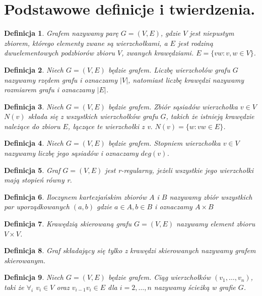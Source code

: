 \documentclass[12pt,a4paper]{article}
\newtheorem{df}{Definicja}[section]
\begin{document}
\section{Podstawowe definicje i twierdzenia.}
\begin{df} 
Grafem nazywamy par\k{e} $G=(V,E)$, gdzie $V$ jest niepustym zbiorem, kt\'orego elementy zwane s\k{a} wierzcho{\l}kami, a $E$ jest rodzin\k{a} dwuelementowych podzbior\'ow zbioru $V$, zwanych kraw\k{e}dziami.
$E=\{vw : v,w\in V \}$.
\end{df}
\begin{df} 
Niech $G=(V,E)$ b\k{e}dzie grafem. Liczb\k{e} wierzcho{\l}\'ow grafu $G$ nazywamy rz\k{e}dem grafu i oznaczamy $|V|$, natomiast liczb\k{e} kraw\k{e}dzi nazywamy rozmiarem grafu i oznaczamy $|E|$.
\end{df}
\begin{df} 
Niech $G=(V,E)$ b\k{e}dzie grafem. Zbi\'or s\k{a}siad\'ow wierzcho{\l}ka $v\in V$ $N(v)$ sk{\l}ada si\k{e} z wszystkich wierzcho{\l}k\'ow grafu $G$, takich \.ze istniej\k{a} kraw\k{e}dzie nale\.z\k{a}ce do zbioru $E$, {\l}\k{a}cz\k{a}ce te wierzcho{\l}ki z v. $N(v)=\{w : vw\in E\}$.
\end{df} 
\begin{df} 
Niech $G=(V,E)$ b\k{e}dzie grafem. Stopniem wierzcho{\l}ka $v\in V$ nazywamy liczb\k{e} jego s\k{a}siad\'ow i oznaczamy $deg(v)$.
\end{df}
\begin{df} 
Graf $G=(V,E)$ jest r-regularny, je\.zeli wszystkie jego wierzcho{\l}ki maj\k{a} stopie\'n r\'owny r.
\end{df} 
\begin{df} 
Iloczynem kartezja\'nskim zbior\'ow $A$ i $B$ nazywamy zbi\'or wszystkich par uporz\k{a}dkowanych $(a,b)$ gdzie $a\in A, b\in B$ i oznaczamy $A\times B$ 
\end{df}
\begin{df} 
Kraw\k{e}dzi\k{a} skierowan\k{a} grafu $G=(V,E)$ nazywamy element zbioru $V\times V$.
\end{df}
\begin{df} 
Graf sk{\l}adaj\k{a}cy si\k{e} tylko z kraw\k{e}dzi skierowanych nazywamy grafem skierowanym.
\end{df}
\begin{df} 
Niech $G=(V,E)$ b\k{e}dzie grafem. Ci\k{a}g wierzcho{\l}k\'ow $(v_{1}, \ldots, v_{n})$, taki \.ze $\forall_{i}$ $v_{i}\in V$ oraz  $v_{i-1}v_{i} \in E$ dla $i=2, \ldots, n$ nazywamy \'scie\.zk\k{a} w grafie $G$.
\end{df} 
\end{document}
